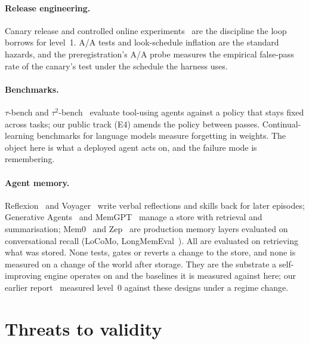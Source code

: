 \documentclass[11pt]{article}
\begin{document}
\paragraph{Release engineering.} Canary release and controlled online experiments~\cite{kohavi}
are the discipline the loop borrows for level~1. A/A tests and look-schedule inflation are the
standard hazards, and the preregistration's A/A probe measures the empirical false-pass rate of
the canary's test under the schedule the harness uses.

\paragraph{Benchmarks.} $\tau$-bench and $\tau^2$-bench~\cite{taubench,tau2bench} evaluate
tool-using agents against a policy that stays fixed across tasks; our public track (E4) amends
the policy between passes. Continual-learning benchmarks for language models measure forgetting
in weights. The object here is what a deployed agent acts on, and the failure mode is
remembering.

\paragraph{Agent memory.} Reflexion~\cite{reflexion} and Voyager~\cite{voyager} write verbal
reflections and skills back for later episodes; Generative Agents~\cite{genagents} and
MemGPT~\cite{memgpt} manage a store with retrieval and summarisation; Mem0~\cite{mem0} and
Zep~\cite{zep} are production memory layers evaluated on conversational recall (LoCoMo,
LongMemEval~\cite{longmemeval}). All are evaluated on retrieving what was stored. None tests,
gates or reverts a change to the store, and none is measured on a change of the world after
storage. They are the substrate a self-improving engine operates on and the baselines it is
measured against here; our earlier report~\cite{senselab-cl} measured level~0 against these
designs under a regime change.

\section{Threats to validity}
\end{document}
